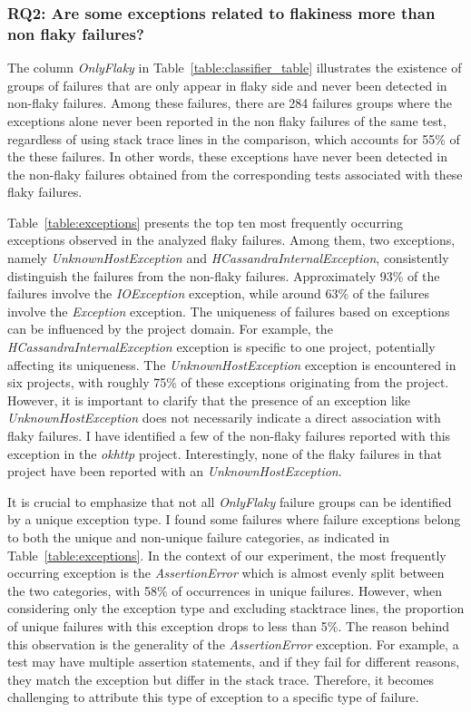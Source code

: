 \subsubsection{RQ2: Are some exceptions related to flakiness more than non flaky failures?}

The column \emph{OnlyFlaky} in Table~\ref{table:classifier_table} illustrates the existence of groups of failures that are only appear in flaky side and never been detected in non-flaky failures.
Among these failures, there are 284 failures groups where the exceptions alone never been reported in the non flaky failures of the same test, regardless of using stack trace lines in the comparison, which accounts for 55\% of the these failures. In other words, these exceptions have never been detected in the non-flaky failures obtained from the corresponding tests associated with these flaky failures.


Table~\ref{table:exceptions} presents the top ten most frequently occurring exceptions observed in the analyzed flaky failures. Among them, two exceptions, namely \emph{UnknownHostException} and \emph{HCassandraInternalException}, consistently distinguish the failures from the non-flaky failures. Approximately 93\% of the failures involve the \emph{IOException} exception, while around 63\% of the failures involve the \emph{Exception} exception.
The uniqueness of failures based on exceptions can be influenced by the project domain. For example, the \emph{HCassandraInternalException} exception is specific to one project, potentially affecting its uniqueness. The \emph{UnknownHostException} exception is encountered in six projects, with roughly 75\% of these exceptions originating from the \alluxio project.
However, it is important to clarify that the presence of an exception like \emph{UnknownHostException} does not necessarily indicate a direct association with flaky failures. I have identified a few of the non-flaky failures reported with this exception in the \emph{okhttp} project. Interestingly, none of the flaky failures in that project have been reported with an \emph{UnknownHostException}.




It is crucial to emphasize that not all \emph{OnlyFlaky} failure groups can be identified by a unique exception type. I found some failures where failure exceptions belong to both the unique and non-unique failure categories, as indicated in Table~\ref{table:exceptions}. In the context of our experiment, the most frequently occurring exception is the \emph{AssertionError} which is almost evenly split between the two categories, with 58\% of occurrences in unique failures. However, when considering only the exception type and excluding stacktrace lines, the proportion of unique failures with this exception drops to less than 5\%.
The reason behind this observation is the generality of the \emph{AssertionError} exception. For example, a test may have multiple assertion statements, and if they fail for different reasons, they match the exception but differ in the stack trace. Therefore, it becomes challenging to attribute this type of exception to a specific type of failure.



